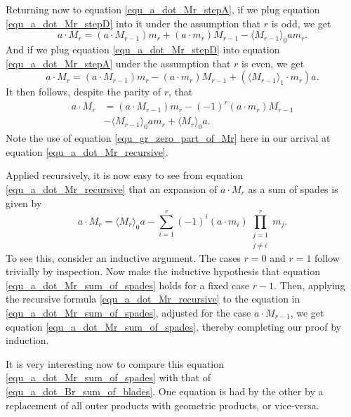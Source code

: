 \documentclass{birkjour}
\theoremstyle{definition}
\theoremstyle{remark}
\numberwithin{equation}{section}
\begin{document}
Returning now to equation \eqref{equ_a_dot_Mr_stepA}, if we plug equation \eqref{equ_a_dot_Mr_stepD} into it
under the assumption that $r$ is odd, we get
\begin{equation}
a\cdot M_r = (a\cdot M_{r-1})m_r + (a\cdot m_r)M_{r-1} - \langle M_{r-1}\rangle_0am_r.
\end{equation}
And if we plug equation \eqref{equ_a_dot_Mr_stepD} into equation \eqref{equ_a_dot_Mr_stepA} under the assumption
that $r$ is even, we get
\begin{equation}
a\cdot M_r = (a\cdot M_{r-1})m_r - (a\cdot m_r)M_{r-1} + (\langle M_{r-1}\rangle_1\cdot m_r)a.
\end{equation}
It then follows, despite the parity of $r$, that
\begin{align}
a\cdot M_r &= (a\cdot M_{r-1})m_r - (-1)^r(a\cdot m_r)M_{r-1}\nonumber \\
 &- \langle M_{r-1}\rangle_0am_r + \langle M_r\rangle_0a.\label{equ_a_dot_Mr_recursive}
\end{align}
Note the use of equation \eqref{equ_gr_zero_part_of_Mr} here in our arrival at equation \eqref{equ_a_dot_Mr_recursive}.

Applied recursively, it is now easy to see from equation \eqref{equ_a_dot_Mr_recursive} that an expansion of
$a\cdot M_r$ as a sum of spades is given by
\begin{equation}\label{equ_a_dot_Mr_sum_of_spades}
a\cdot M_r = \langle M_r\rangle_0a - \sum_{i=1}^r(-1)^i(a\cdot m_i)\prod_{\substack{j=1\\j\neq i}}^rm_j.
\end{equation}
To see this, consider an inductive argument.  The cases $r=0$ and $r=1$ follow trivially by inspection.
Now make the inductive hypothesis that equation \eqref{equ_a_dot_Mr_sum_of_spades} holds for a fixed case $r-1$.
Then, applying the recursive formula \eqref{equ_a_dot_Mr_recursive} to the equation in \eqref{equ_a_dot_Mr_sum_of_spades},
adjusted for the case $a\cdot M_{r-1}$, we get equation \eqref{equ_a_dot_Mr_sum_of_spades}, thereby completing
our proof by induction.

It is very interesting now to compare this equation \eqref{equ_a_dot_Mr_sum_of_spades} with that of \eqref{equ_a_dot_Br_sum_of_blades}.
One equation is had by the other by a replacement of all outer products with geometric products, or vice-versa.
\end{document}
